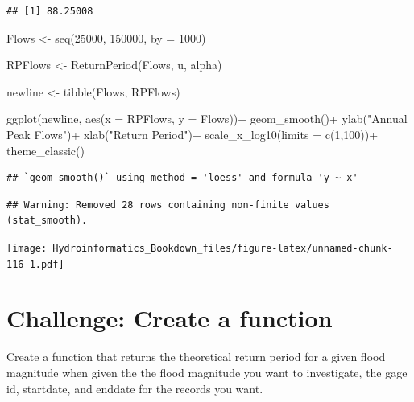 \documentclass[
]{book}
\newenvironment{Shaded}{\begin{snugshade}}{\end{snugshade}}
\newcommand{\AttributeTok}[1]{\textcolor[rgb]{0.77,0.63,0.00}{#1}}
\newcommand{\DecValTok}[1]{\textcolor[rgb]{0.00,0.00,0.81}{#1}}
\newcommand{\FunctionTok}[1]{\textcolor[rgb]{0.00,0.00,0.00}{#1}}
\newcommand{\NormalTok}[1]{#1}
\newcommand{\OtherTok}[1]{\textcolor[rgb]{0.56,0.35,0.01}{#1}}
\newcommand{\SpecialCharTok}[1]{\textcolor[rgb]{0.00,0.00,0.00}{#1}}
\newcommand{\StringTok}[1]{\textcolor[rgb]{0.31,0.60,0.02}{#1}}
\begin{document}
\begin{verbatim}
## [1] 88.25008
\end{verbatim}

\begin{Shaded}
\begin{Highlighting}[]
\NormalTok{Flows }\OtherTok{\textless{}{-}} \FunctionTok{seq}\NormalTok{(}\DecValTok{25000}\NormalTok{, }\DecValTok{150000}\NormalTok{, }\AttributeTok{by =} \DecValTok{1000}\NormalTok{)}

\NormalTok{RPFlows }\OtherTok{\textless{}{-}} \FunctionTok{ReturnPeriod}\NormalTok{(Flows, u, alpha)}

\NormalTok{newline }\OtherTok{\textless{}{-}} \FunctionTok{tibble}\NormalTok{(Flows, RPFlows)}

\FunctionTok{ggplot}\NormalTok{(newline, }\FunctionTok{aes}\NormalTok{(}\AttributeTok{x =}\NormalTok{ RPFlows, }\AttributeTok{y =}\NormalTok{ Flows))}\SpecialCharTok{+}
        \FunctionTok{geom\_smooth}\NormalTok{()}\SpecialCharTok{+}
        \FunctionTok{ylab}\NormalTok{(}\StringTok{"Annual Peak Flows"}\NormalTok{)}\SpecialCharTok{+}
        \FunctionTok{xlab}\NormalTok{(}\StringTok{"Return Period"}\NormalTok{)}\SpecialCharTok{+}
        \FunctionTok{scale\_x\_log10}\NormalTok{(}\AttributeTok{limits =} \FunctionTok{c}\NormalTok{(}\DecValTok{1}\NormalTok{,}\DecValTok{100}\NormalTok{))}\SpecialCharTok{+}
        \FunctionTok{theme\_classic}\NormalTok{()}
\end{Highlighting}
\end{Shaded}

\begin{verbatim}
## `geom_smooth()` using method = 'loess' and formula 'y ~ x'
\end{verbatim}

\begin{verbatim}
## Warning: Removed 28 rows containing non-finite values (stat_smooth).
\end{verbatim}

\texttt{[image: Hydroinformatics\_Bookdown\_files/figure-latex/unnamed-chunk-116-1.pdf]}

\hypertarget{challenge-create-a-function}{%
\section{Challenge: Create a function}\label{challenge-create-a-function}}

Create a function that returns the theoretical return period for a given flood magnitude when given the the flood magnitude you want to investigate, the gage id, startdate, and enddate for the records you want.
\end{document}
